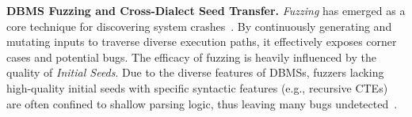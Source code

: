 \documentclass[sigconf,review,anonymous]{acmart}
\begin{document}







\textbf{DBMS Fuzzing and Cross-Dialect Seed Transfer.} 
\textit{Fuzzing} has emerged as a core technique for discovering system crashes~\cite{sqlsmith, zhong2020squirrel}. By continuously generating and mutating inputs to traverse diverse execution paths, it effectively exposes corner cases and potential bugs.
The efficacy of fuzzing is heavily influenced by the quality of \textit{Initial Seeds}. 
Due to the diverse features of DBMSs, fuzzers lacking high-quality initial seeds with specific syntactic features (e.g., recursive CTEs) are often confined to shallow parsing logic, thus leaving many bugs undetected~\cite{wang2021industry}.
\end{document}
